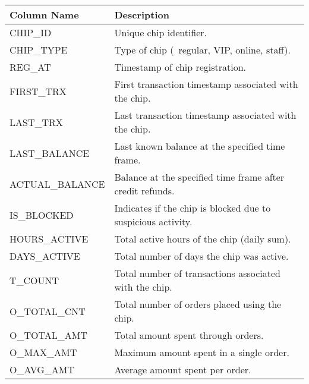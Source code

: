 \begin{table}[H]
	\centering
	\footnotesize
	\begin{tabularx}{\textwidth}{|>{\columncolor{unicorn_blue!5}}X|>{\columncolor{unicorn_blue!5}}l|}
		\hline
		\rowcolor{unicorn_blue}
		\textbf{\color{white} Column Name} & \textbf{\color{white} Description}                           \\
		\hline
		\hline
		CHIP\_ID                             & Unique chip identifier.                                      \\
		CHIP\_TYPE                           & Type of chip (\eg~regular, VIP, online, staff).              \\
		REG\_AT                              & Timestamp of chip registration.                              \\
		FIRST\_TRX                           & First transaction timestamp associated with the chip.        \\
		LAST\_TRX                            & Last transaction timestamp associated with the chip.         \\
		LAST\_BALANCE                        & Last known balance at the specified time frame.              \\
		ACTUAL\_BALANCE                      & Balance at the specified time frame after credit refunds.    \\
		\hline
		IS\_BLOCKED                          & Indicates if the chip is blocked due to suspicious activity. \\
		HOURS\_ACTIVE                        & Total active hours of the chip (daily sum).                  \\
		DAYS\_ACTIVE                         & Total number of days the chip was active.                    \\
		\hline
		T\_COUNT                             & Total number of transactions associated with the chip.       \\
		O\_TOTAL\_CNT                        & Total number of orders placed using the chip.                \\
		O\_TOTAL\_AMT                        & Total amount spent through orders.                           \\
		O\_MAX\_AMT                          & Maximum amount spent in a single order.                      \\
		O\_AVG\_AMT                          & Average amount spent per order.                              \\

\end{tabularx}
\end{table}
